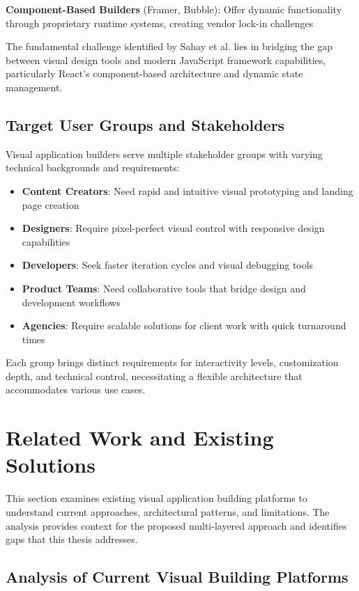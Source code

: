 \documentclass[oneside,12pt]{book}
\begin{document}
\textbf{Component-Based Builders} (Framer, Bubble): Offer dynamic functionality through proprietary runtime systems, creating vendor lock-in challenges


The fundamental challenge identified by Sahay et al. lies in bridging the gap between visual design tools and modern JavaScript framework capabilities, particularly React's component-based architecture and dynamic state management. 


\subsection{Target User Groups and Stakeholders}

Visual application builders serve multiple stakeholder groups with varying technical backgrounds and requirements:

\begin{itemize}
    \item \textbf{Content Creators}: Need rapid and intuitive visual prototyping and landing page creation
    \item \textbf{Designers}: Require pixel-perfect visual control with responsive design capabilities
    \item \textbf{Developers}: Seek faster iteration cycles and visual debugging tools
    \item \textbf{Product Teams}: Need collaborative tools that bridge design and development workflows
    \item \textbf{Agencies}: Require scalable solutions for client work with quick turnaround times
\end{itemize}

Each group brings distinct requirements for interactivity levels, customization depth, and technical control, necessitating a flexible architecture that accommodates various use cases.

\section{Related Work and Existing Solutions}
\label{sec:related-work}

This section examines existing visual application building platforms to understand current approaches, architectural patterns, and limitations. The analysis provides context for the proposed multi-layered approach and identifies gaps that this thesis addresses.

\subsection{Analysis of Current Visual Building Platforms}
\end{document}
